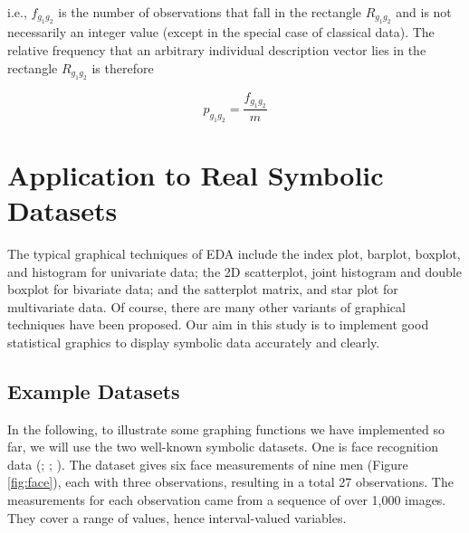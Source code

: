 \documentclass[article]{jss}
\begin{document}
i.e., $f_{g_1g_2}$ is the number of observations that fall in the rectangle $R_{g_1g_2}$ and is not necessarily an integer value (except in the special case of classical data). The relative frequency that an arbitrary individual description vector lies in the rectangle $R_{g_1g_2}$ is therefore

\begin{equation}\label{eq:bi_rel_fg}
p_{g_1g_2} = \frac{f_{g_1g_2}}{m}
\end{equation}










\section{Application to Real Symbolic Datasets}

The typical graphical techniques of EDA include the index plot, barplot, boxplot, and histogram for univariate data; the 2D scatterplot, joint histogram and double boxplot for bivariate data; and the satterplot matrix, and star plot for multivariate data. Of course, there are many other variants of graphical techniques have been proposed. Our aim in this study is to implement good statistical graphics to display symbolic data accurately and clearly. 

\subsection{Example Datasets}

In the following, to illustrate some graphing functions we have implemented so far, we will use the two well-known symbolic datasets. One is face recognition data (\cite{leroy:1996}; \cite{douzal:2011}; \cite{le:2012}). The dataset gives six face measurements of nine men (Figure \ref{fig:face}), each with three observations, resulting in a total 27 observations. The measurements for each observation came from a sequence of over 1,000 images. They cover a range of values, hence interval-valued variables. 
\end{document}
